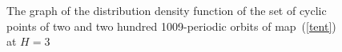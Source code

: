 \documentclass[12pt,a4paper]{amsart}
\begin{document}
\begin{figure}[h!]
\begin{minipage}[h]{0.45\linewidth}
\end{minipage}
\hspace{1cm}
\begin{minipage}[h]{0.45\linewidth}
\end{minipage}
\caption{The graph of the distribution density function of the set of cyclic points of two and two hundred 1009-periodic orbits of map~(\ref{tent}) at $H=3$} \label{f15}
\end{figure}
\end{document}
